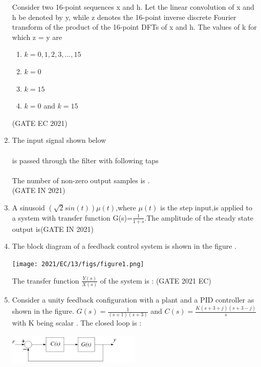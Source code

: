 \begin{enumerate}[label=\thechapter.\arabic*,ref=\thechapter.\theenumi]
Consider two 16-point sequences x and h. Let the linear convolution of x and h be denoted by y, while z denotes the 16-point inverse discrete Fourier transform  of the product of the 16-point DFTs of x and h. The values of k for which z = y are 
\begin{enumerate}
    \item $k = 0, 1, 2, 3, ... , 15$
    \item $k = 0$
    \item $k = 15$
    \item $k = 0$ and $k = 15$
\end{enumerate}
\hfill(GATE EC 2021)\\
\solution

\pagebreak
\item The input signal shown below \\
\\
is passed through the filter with following taps\\
\\
The number of non-zero output samples is \underline{\hspace{1cm}}.\\
\hfill(GATE IN 2021)
\solution

\pagebreak
\item A sinusoid $(\sqrt{2}sin(t))\mu(t)$,where $\mu(t)$ is the step input,is applied to a system with transfer function G(s)=$\frac{1}{1+s}$.The amplitude of the steady state output is\hfill{(GATE IN 2021)}\\
\solution

\pagebreak
\item The block diagram of a feedback control system is shown in the figure .
\begin{center}
\texttt{[image: 2021/EC/13/figs/figure1.png]}
\end{center}
The transfer function $\frac{Y(s)}{X(s)}$ of the system is :
\hfill(GATE 2021 EC)\\
\solution

\pagebreak
\item Consider a unity feedback configuration with a plant and a PID controller as shown in the figure. $G(s) = \frac{1}{(s+1)(s+3)} $ and $ C(s) = \frac{K(s+3+j)(s+3-j)}{s}$ with K being scalar . The closed loop is :
\begin{center}
\includegraphics[width=0.5\textwidth]{2021/IN/29/figs/figure1.jpg}

\end{center}
\end{enumerate}
